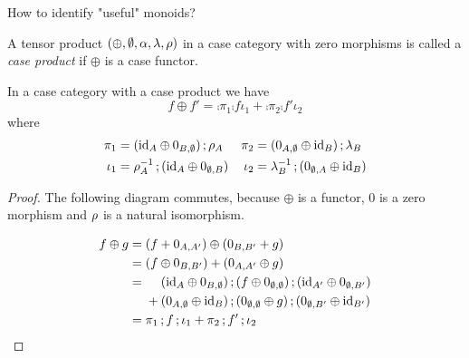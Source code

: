 \documentclass[runningheads,envcountsame]{llncs}
\begin{document}
How to identify "useful" monoids?
\begin{definition}
    A tensor product $(\oplus, \emptyset, \assoc, \unitl, \unitr)$ in a case category with zero morphisms is called a \emph{case product} if
    $\oplus$ is a case functor.
\end{definition}
\begin{lemma}
    In a case category with a case product we have \[
    f \oplus f' = \comp{\pi_1}{\comp{f}{\iota_1}} + \comp{\pi_2}{\comp{f'}{\iota_2}}
    \] 
    where
    \begin{align}
        \pi_1 &= \comp{(\id_A \oplus 0_{B, \emptyset})}{\unitr_A} & \pi_2 &= \comp{(0_{A, \emptyset} \oplus \id_B)}{\unitl_B} \\
        \iota_1 &= \comp{\unitr_A^{-1}}{(\id_A \oplus 0_{\emptyset, B})} & \iota_2 &= \comp{\unitl_B^{-1}}{(0_{\emptyset, A} \oplus \id_B)}
    \end{align}
\end{lemma}
\begin{proof}
    The following diagram commutes, because $\oplus$ is a functor, $0$ is a zero morphism and $\unitr$ is a natural isomorphism.
    \begin{center}
    \end{center}

    \begin{align}
        f \oplus g &= (f + 0_{A, A'}) \oplus (0_{B, B'} + g) \\
            &= (f \oplus 0_{B, B'}) + (0_{A, A'} \oplus g) \\
            &= {} \mathbin{\phantom{+}} \comp{(\id_A \oplus 0_{B, \emptyset})}{(f \oplus \comp{0_{\emptyset, \emptyset})}{(\id_{A'} \oplus 0_{\emptyset, B'})}} \\
            &\mathrel{\phantom{=}}  {} + \comp{(0_{A, \emptyset} \oplus \id_B)}{\comp{(0_{\emptyset, \emptyset} \oplus g)}{(0_{\emptyset, B'} \oplus \id_{B'})}}\\
            &= \comp{\pi_1}{\comp{f}{\iota_1}} + \comp{\pi_2}{\comp{f'}{\iota_2}}
    \end{align}
\end{proof}
\end{document}
